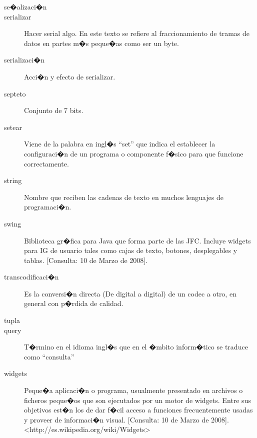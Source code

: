 \begin{description}
	\item[se�alizaci�n]
	
	\item[serializar] Hacer serial algo. En este texto se refiere al fraccionamiento de tramas de datos en partes m�s peque�as como ser un byte.

	\item[serializaci�n] Acci�n y efecto de serializar.
	
	\item[septeto] Conjunto de 7 bits.
	
	\item[setear] Viene de la palabra en ingl�s ``set'' que indica el establecer la configuraci�n de un programa o componente f�sico para que funcione correctamente.
	
	\item[string] Nombre que reciben las cadenas de texto en muchos lenguajes de programaci�n.
	
	\item[swing] Biblioteca gr�fica para Java que forma parte de las \ac{JFC}. Incluye widgets para \ac{IG} de usuario tales como cajas de texto, botones, desplegables y tablas. [Consulta: 10 de Marzo de 2008].%
	
	\item[transcodificaci�n] Es la conversi�n directa (De digital a digital) de un codec a otro, en general con p�rdida de calidad.
	
	\item[tupla]
	
	\item[query] T�rmino en el idioma ingl�s que en el �mbito inform�tico se traduce como ``consulta''
	
	\item[widgets] Peque�a aplicaci�n o programa, usualmente presentado en archivos o ficheros peque�os que son ejecutados por un motor de widgets. Entre sus objetivos est�n los de dar f�cil acceso a funciones frecuentemente usadas y proveer de informaci�n visual. [Consulta: 10 de Marzo de 2008].\\ <http://es.wikipedia.org/wiki/Widgets>




\end{description}
